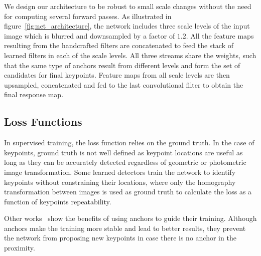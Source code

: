 
We design our architecture to be robust to small scale changes without the need for computing several forward passes. 
As illustrated in figure~\ref{fig:net_architecture}, the network includes three scale levels of the input image which is blurred and downsampled by a factor of $1.2$. All the feature maps resulting from the handcrafted filters are concatenated to feed the stack of learned filters in each of the scale levels. All three streams share the weights, such that the same type of anchors result from different levels and form the set of candidates for final keypoints. 
Feature maps from all scale levels are then upsampled, concatenated and fed to the last convolutional filter to obtain the final response map. 


\subsection{Loss Functions}
\label{sec:loss_functions}

In supervised training, the loss function relies on the ground truth. In the case of keypoints, ground truth is not well defined as keypoint locations are useful as long as they can be accurately detected regardless of geometric or photometric image transformation. 
Some learned detectors \cite{Karel_Vedaldi_ECCV_16,savinov2016quad,OnoSerra18} train the network to identify keypoints without constraining their locations, where only the homography transformation between images is used as ground truth to calculate the loss as a function of keypoints repeatability. 

Other works~\cite{TILDE,detone2017superpoint,Zhang_Felix_CVPR_17} show the benefits of using anchors to guide their training. Although anchors make the training more stable and lead to better results, they prevent the network from proposing new keypoints in case there is no anchor in the proximity. 

